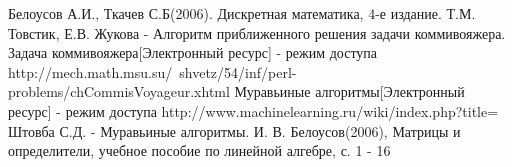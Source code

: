 \documentclass[a4paper,12pt]{report}
\begin{document}
	 \begin{thebibliography}{3}
		 Белоусов А.И., Ткачев С.Б(2006). Дискретная математика, 4-е издание.
		 Т.М. Товстик, Е.В. Жукова - Алгоритм приближенного решения задачи коммивояжера.
		 Задача коммивояжера[Электронный ресурс] - режим доступа http://mech.math.msu.su/~shvetz/54/inf/perl-problems/chCommisVoyageur.xhtml
		 Муравьиные алгоритмы[Электронный ресурс] - режим доступа http://www.machinelearning.ru/wiki/index.php?title=%
		 Штовба С.Д. - Муравьиные алгоритмы.
		 И. В. Белоусов(2006), Матрицы и определители, учебное пособие по линейной алгебре, с. 1 - 16
	\end{thebibliography}
\end{document}
